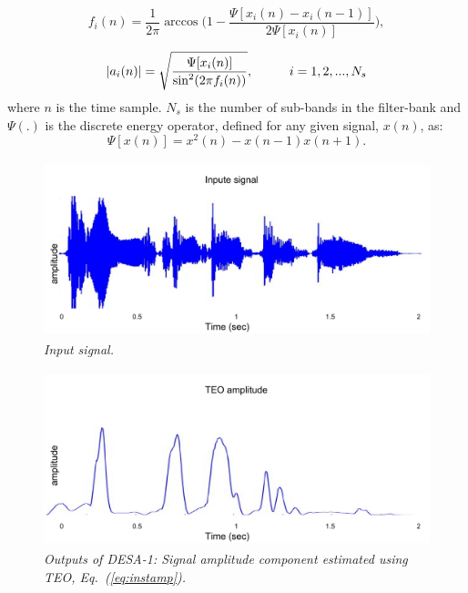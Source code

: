 {\begin{equation}
	\label{eq:instfreq}
	f_i(n) = \frac{1}{2\pi}\arccos \Big (1-\frac{\Psi[x_i(n)-x_i(n-1)]}{2\Psi[x_i(n)]}\Big),
\end{equation}
	
	
\begin{equation}
	\label{eq:instamp}
	|a_i(n)| = \sqrt{\frac{\Psi[x_i(n)]}{\sin^2(2\pi f_i(n))}} , \hspace{10mm}i=1,2,...,N_s
\end{equation}
where $n$ is the time sample. $N_s$ is the number of sub-bands in the filter-bank and $\Psi(.)$ is the discrete energy operator, defined for any given signal, $x(n)$, as:
\begin{equation}
	\Psi [x(n)] = x^2(n)-x(n-1)x(n+1).
\end{equation}


\begin{figure}[h!]
	\centering
	\includegraphics[height=2in, width=1\textwidth]{figures/teo_signal}
	\caption{\it Input signal.}
\end{figure}
	
\vspace{1.0mm}
\begin{figure}[h!]
	\centering
	\includegraphics[height=2in, width=1\textwidth]{figures/teo_amp}
	\caption{\it Outputs of DESA-1: Signal amplitude component estimated using TEO, Eq.~(\ref{eq:instamp}).}
\end{figure}

}

